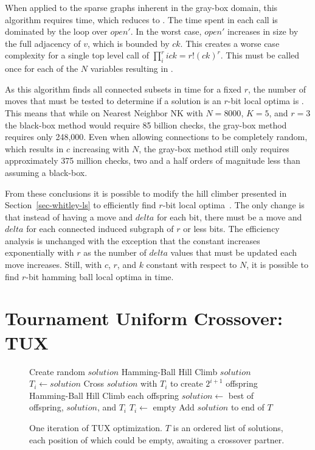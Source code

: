 When applied to the sparse graphs inherent in the gray-box domain, this algorithm
requires  time, which reduces to . The time spent
in each call is dominated by the loop over $open'$. In the worst case, $open'$
increases in size by the full adjacency of $v$, which is bounded by $ck$.
This creates a worse case complexity for a single top level call of
$\prod_{i}^{r} ick = r!(ck)^r$. This must be called once for each
of the $N$ variables resulting in .

As this algorithm finds all connected subsets in  time for a fixed $r$, the number of moves
that must be tested to determine if a solution is an $r$-bit local optima is . This means that
while on Nearest Neighbor NK with $N=8000$, $K=5$, and $r=3$ the black-box method would require 85 billion
checks, the gray-box method requires only 248,000. Even when allowing connections to be completely random,
which results in $c$ increasing with $N$, the gray-box method still only requires approximately 375 million checks,
two and a half orders of magnitude less than assuming a black-box.

From these conclusions it is possible to modify the hill climber presented in Section~\ref{sec-whitley-ls} to
efficiently find $r$-bit local optima~\cite{chicano:2014:ball}. The only change is that instead of having a move
and $delta$ for each bit, there must be a move and $delta$ for each connected induced subgraph of $r$ or less bits.
The efficiency analysis is unchanged with the exception that the constant increases exponentially with $r$ as
the number of $delta$ values that must be updated each move increases. Still, with $c$, $r$, and $k$ constant
with respect to $N$, it is possible to find $r$-bit hamming ball local optima in  time.

\section{Tournament Uniform Crossover: TUX}
\label{sec-tux}
\begin{figure}
  \begin{algorithmic}[1]
    \State Create random $solution$
    \State Hamming-Ball Hill Climb $solution$
        \State $T_i \leftarrow solution$
        \State \Return
      \EndIf
      \State Cross $solution$ with $T_i$ to create $2^{i+1}$ offspring
      \State Hamming-Ball Hill Climb each offspring
      \State $solution \leftarrow$ best of offspring, $solution$, and $T_i$
      \State $T_i \leftarrow$ empty
    \EndFor
    \State Add $solution$ to end of $T$
  \EndProcedure
\end{algorithmic}
  \caption{One iteration of TUX optimization. $T$ is an
           ordered list of solutions, each position of which could be empty,
           awaiting a crossover partner.}
  \label{fig-TUX}
\end{figure}

